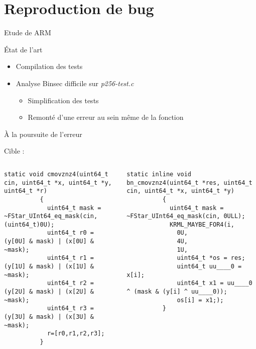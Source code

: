 \documentclass[A4,svgnames,9pt,aspectratio=169]{beamer}
\begin{document}

\section{Reproduction de bug}
\frame{\sectionpage}

\begin{frame}{Etude de ARM}
  \begin{block}{État de l'art}
    \begin{itemize}
      \item Compilation des tests \pause
      \item Analyse Binsec difficile sur \textit{p256-test.c}\pause
      \begin{itemize}
        \item Simplification des tests
        \item Remonté d'une erreur au sein même de la fonction
      \end{itemize}
    \end{itemize}
  \end{block}
\end{frame}


\begin{frame}[fragile]{À la poursuite de l'erreur}
  \begin{block}{Cible :}
    \begin{columns}
      \begin{column}{0.5\textwidth}
        \begin{lstlisting}[style=CStyle, caption={Hacl\_P256.h/cmovznz4}, gobble=10]
          static void cmovznz4(uint64_t cin, uint64_t *x, uint64_t *y, uint64_t *r)
          {
            uint64_t mask = ~FStar_UInt64_eq_mask(cin, (uint64_t)0U);
            uint64_t r0 = (y[0U] & mask) | (x[0U] & ~mask);
            uint64_t r1 = (y[1U] & mask) | (x[1U] & ~mask);
            uint64_t r2 = (y[2U] & mask) | (x[2U] & ~mask);
            uint64_t r3 = (y[3U] & mask) | (x[3U] & ~mask);
            r=[r0,r1,r2,r3];
          }
      \end{lstlisting}
      \end{column}
      \begin{column}{0.5\textwidth}
        \begin{lstlisting}[style=CStyle, caption={Hacl\_P256.h/bn\_cmovznz4}, gobble=10]
          static inline void bn_cmovznz4(uint64_t *res, uint64_t cin, uint64_t *x, uint64_t *y)
          {
            uint64_t mask = ~FStar_UInt64_eq_mask(cin, 0ULL);
            KRML_MAYBE_FOR4(i,
              0U,
              4U,
              1U,
              uint64_t *os = res;
              uint64_t uu____0 = x[i];
              uint64_t x1 = uu____0 ^ (mask & (y[i] ^ uu____0));
              os[i] = x1;);
          }
      \end{lstlisting}
      \end{column}
    \end{columns}
  \end{block}
  
\end{frame}
\end{document}
